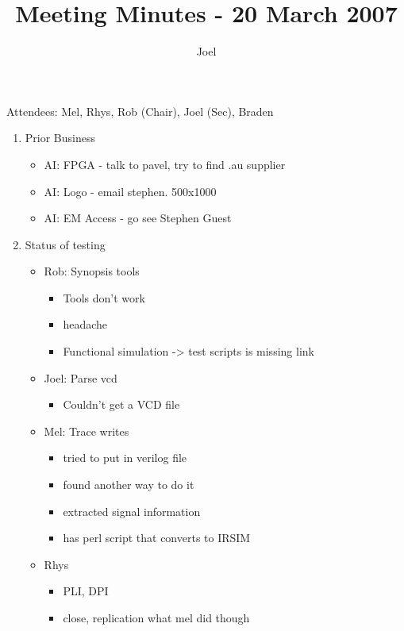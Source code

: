 \documentclass{article}
\begin{document}
\author{Joel}
\title{Meeting Minutes - 20 March 2007}
\maketitle
\begin{flushleft}
Attendees:
Mel,
Rhys,
Rob (Chair),
Joel (Sec),
Braden
\newline

\begin{enumerate}
  \item Prior Business
    \begin{itemize}
    \item AI: FPGA - talk to pavel, try to find .au supplier
    \item AI: Logo - email stephen. 500x1000
    \item AI: EM Access - go see Stephen Guest
    \end{itemize}

  \item Status of testing 
    \begin{itemize}
    \item Rob: Synopsis tools 
      \begin{itemize}
      \item Tools don't work
      \item headache
      \item Functional simulation -> test scripts is missing link
      \end{itemize}
    \item Joel: Parse vcd
      \begin{itemize}
      \item Couldn't get a VCD file
      \end{itemize}
    \item Mel: Trace writes
      \begin{itemize}
      \item tried to put in verilog file
      \item found another way to do it
      \item extracted signal information
      \item has perl script that converts to IRSIM
      \end{itemize}
    \item Rhys
      \begin{itemize}
      \item PLI, DPI
      \item close, replication what mel did though
      \end{itemize}
    \end{itemize}


\end{enumerate}
\end{flushleft}
\end{document}
